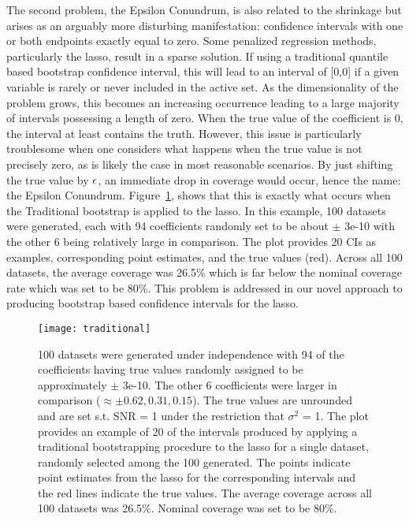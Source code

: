 The second problem, the Epsilon Conundrum, is also related to the shrinkage but arises as an arguably more disturbing manifestation: confidence intervals with one or both endpoints exactly equal to zero. Some penalized regression methods, particularly the lasso, result in a sparse solution. If using a traditional quantile based bootstrap confidence interval, this will lead to an interval of [0,0] if a given variable is rarely or never included in the active set. As the dimensionality of the problem grows, this becomes an increasing occurrence leading to a large majority of intervals possessing a length of zero. When the true value of the coefficient is 0, the interval at least contains the truth. However, this issue is particularly troublesome when one considers what happens when the true value is not precisely zero, as is likely the case in most reasonable scenarios. By just shifting the true value by $\epsilon$, an immediate drop in coverage would occur, hence the name: the Epsilon Conundrum. Figure~\ref{Fig:traditional}, shows that this is exactly what occurs when the Traditional bootstrap is applied to the lasso. In this example, 100 datasets were generated, each with 94 coefficients randomly set to be about $\pm$ 3e-10 with the other 6 being relatively large in comparison. The plot provides 20 CIs as examples, corresponding point estimates, and the true values (red). Across all 100 datasets, the average coverage was 26.5\% which is far below the nominal coverage rate which was set to be 80\%. This problem is addressed in our novel approach to producing bootstrap based confidence intervals for the lasso.

\begin{figure}[hbtp]
  \texttt{[image: traditional]}
  \caption{\label{Fig:traditional} 100 datasets were generated under independence with 94 of the coefficients having true values randomly assigned to be approximately $\pm$ 3e-10. The other 6 coefficients were larger in comparison ($\approx \pm 0.62, 0.31, 0.15$). The true values are unrounded and are set s.t. SNR = 1 under the restriction that $\sigma^2$ = 1. The plot provides an example of 20 of the intervals produced by applying a traditional bootstrapping procedure to the lasso for a single dataset, randomly selected among the 100 generated. The points indicate point estimates from the lasso for the corresponding intervals and the red lines indicate the true values. The average coverage across all 100 datasets was 26.5\%. Nominal coverage was set to be 80\%.}
\end{figure}

